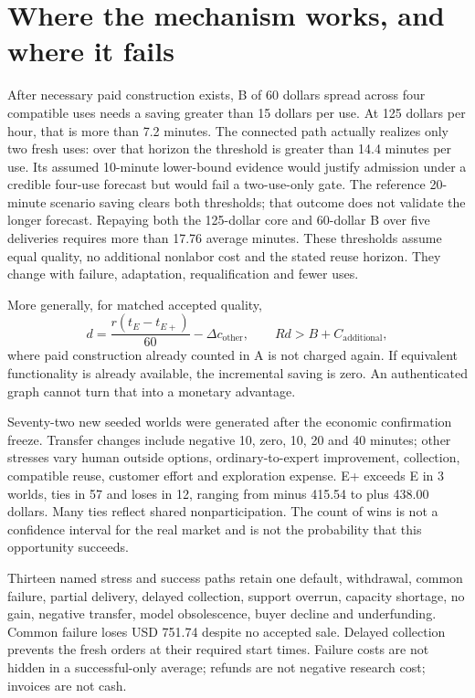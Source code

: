 \section{Where the mechanism works, and where it fails}

After necessary paid construction exists, B of 60 dollars spread across four compatible uses needs a saving greater than 15 dollars per use. At 125 dollars per hour, that is more than 7.2 minutes. The connected path actually realizes only two fresh uses: over that horizon the threshold is greater than 14.4 minutes per use. Its assumed 10-minute lower-bound evidence would justify admission under a credible four-use forecast but would fail a two-use-only gate. The reference 20-minute scenario saving clears both thresholds; that outcome does not validate the longer forecast. Repaying both the 125-dollar core and 60-dollar B over five deliveries requires more than 17.76 average minutes. These thresholds assume equal quality, no additional nonlabor cost and the stated reuse horizon. They change with failure, adaptation, requalification and fewer uses.

More generally, for matched accepted quality,
\[
d=\frac{r(t_E-t_{E+})}{60}-\Delta c_{\mathrm{other}},\qquad Rd>B+C_{\mathrm{additional}},
\]
where paid construction already counted in A is not charged again. If equivalent functionality is already available, the incremental saving is zero. An authenticated graph cannot turn that into a monetary advantage.

Seventy-two new seeded worlds were generated after the economic confirmation freeze. Transfer changes include negative 10, zero, 10, 20 and 40 minutes; other stresses vary human outside options, ordinary-to-expert improvement, collection, compatible reuse, customer effort and exploration expense. E+ exceeds E in 3 worlds, ties in 57 and loses in 12, ranging from minus 415.54 to plus 438.00 dollars. Many ties reflect shared nonparticipation. The count of wins is not a confidence interval for the real market and is not the probability that this opportunity succeeds.

Thirteen named stress and success paths retain one default, withdrawal, common failure, partial delivery, delayed collection, support overrun, capacity shortage, no gain, negative transfer, model obsolescence, buyer decline and underfunding. Common failure loses USD 751.74 despite no accepted sale. Delayed collection prevents the fresh orders at their required start times. Failure costs are not hidden in a successful-only average; refunds are not negative research cost; invoices are not cash.

